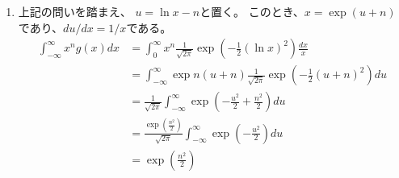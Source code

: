 \documentclass[12pt,b5paper]{ltjsarticle}
\begin{document}
\begin{description}
\begin{enumerate}
\begin{enumerate}
              \item
                   上記の問いを踏まえ、
                   $u=\ln{x} -n$と置く。
                   このとき、$x=\exp{(u+n)}$であり、$du/dx=1/x$である。
                   \begin{align}
                    \int_{-\infty}^{\infty} x^{n}g(x) dx
                    &= \int_{0}^{\infty} x^{n} \frac{1}{\sqrt{2\pi}}\exp{\left(-\frac{1}{2}(\ln{x})^{2}\right)} \frac{dx}{x}\\
                    &= \int_{-\infty}^{\infty} \exp{n(u+n)} \frac{1}{\sqrt{2\pi}}\exp{\left(-\frac{1}{2}(u+n)^{2}\right)} du\\
                    &= \frac{1}{\sqrt{2\pi}} \int_{-\infty}^{\infty} \exp{\left(-\frac{u^{2}}{2}+ \frac{n^{2}}{2}\right)}du\\
                    &= \frac{\exp{(\frac{n^{2}}{2})}}{\sqrt{2\pi}} \int_{-\infty}^{\infty} \exp{\left(-\frac{u^{2}}{2}\right)}du\\
                    &= \exp{\left(\frac{n^{2}}{2}\right)}
                   \end{align}



             \end{enumerate}

       \end{enumerate}

       \hrulefill

\end{description}

\hrulefill
\end{document}
